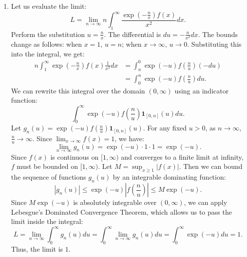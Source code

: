 \documentclass[10pt,a4paper]{article}
\begin{document}
\begin{enumerate}[label=\fbox{\arabic*}]
  \item %
        Let us evaluate the limit:
        \[
          L = \lim_{n \to \infty} n \int_1^\infty \frac{\exp(-\frac{n}{x}) f(x)}{x^2} dx.
        \]
        Perform the substitution $u = \frac{n}{x}$. The differential is $du = -\frac{n}{x^2} dx$.
        The bounds change as follows: when $x = 1$, $u = n$; when $x \to \infty$, $u \to 0$.
        Substituting this into the integral, we get:
        \begin{align*}
          n \int_1^\infty \exp\left(-\frac{n}{x}\right) f(x) \frac{1}{x^2} dx &= \int_n^0 \exp(-u) f\left(\frac{n}{u}\right) (-du) \\
          &= \int_0^n \exp(-u) f\left(\frac{n}{u}\right) du.
        \end{align*}
        We can rewrite this integral over the domain $(0, \infty)$ using an indicator function:
        \[
          \int_0^\infty \exp(-u) f\left(\frac{n}{u}\right) \mathbf{1}_{[0, n]}(u) du.
        \]
        Let $g_n(u) = \exp(-u) f\left(\frac{n}{u}\right) \mathbf{1}_{[0, n]}(u)$. For any fixed $u > 0$, as $n \to \infty$, $\frac{n}{u} \to \infty$. Since $\lim_{x \to \infty} f(x) = 1$, we have:
        \[
          \lim_{n \to \infty} g_n(u) = \exp(-u) \cdot 1 \cdot 1 = \exp(-u).
        \]
        Since $f(x)$ is continuous on $[1, \infty)$ and converges to a finite limit at infinity, $f$ must be bounded on $[1, \infty)$. Let $M = \sup_{x \ge 1} |f(x)|$.
        Then we can bound the sequence of functions $g_n(u)$ by an integrable dominating function:
        \[
          |g_n(u)| \le \exp(-u) \left| f\left(\frac{n}{u}\right) \right| \le M \exp(-u).
        \]
        Since $M \exp(-u)$ is absolutely integrable over $(0, \infty)$, we can apply Lebesgue's Dominated Convergence Theorem, which allows us to pass the limit inside the integral:
        \[
          L = \lim_{n \to \infty} \int_0^\infty g_n(u) du = \int_0^\infty \lim_{n \to \infty} g_n(u) du = \int_0^\infty \exp(-u) du = 1.
        \]
        Thus, the limit is $1$.


\end{enumerate}
\end{document}
